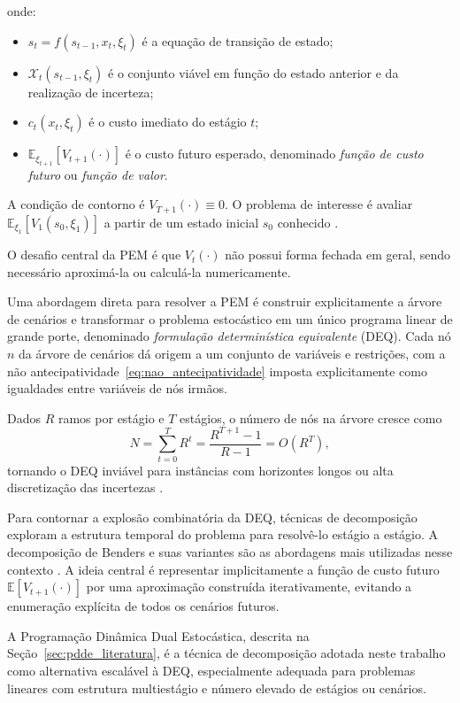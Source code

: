 onde:
\begin{itemize}
  \item $s_t = f(s_{t-1}, x_t, \xi_t)$ é a equação de transição de estado;
  \item $\mathcal{X}_t(s_{t-1}, \xi_t)$ é o conjunto viável em função do estado anterior e da realização de incerteza;
  \item $c_t(x_t, \xi_t)$ é o custo imediato do estágio $t$;
  \item $\mathbb{E}_{\xi_{t+1}}[V_{t+1}(\cdot)]$ é o custo futuro esperado, denominado \emph{função de custo futuro} ou \emph{função de valor}.
\end{itemize}

A condição de contorno é $V_{T+1}(\cdot) \equiv 0$. O problema de interesse é avaliar $\mathbb{E}_{\xi_1}[V_1(s_0, \xi_1)]$ a partir de um estado inicial $s_0$ conhecido \cite{shapiro2009,birge2011}.

O desafio central da PEM é que $V_t(\cdot)$ não possui forma fechada em geral, sendo necessário aproximá-la ou calculá-la numericamente.

Uma abordagem direta para resolver a PEM é construir explicitamente a árvore de cenários e transformar o problema estocástico em um único programa linear de grande porte, denominado \emph{formulação determinística equivalente} (DEQ). Cada nó $n$ da árvore de cenários dá origem a um conjunto de variáveis e restrições, com a não antecipatividade~\eqref{eq:nao_antecipatividade} imposta explicitamente como igualdades entre variáveis de nós irmãos.

Dados $R$ ramos por estágio e $T$ estágios, o número de nós na árvore cresce como
\begin{equation}
  N = \sum_{t=0}^{T} R^t = \frac{R^{T+1} - 1}{R - 1} = O(R^T),
  \label{eq:crescimento_deq}
\end{equation}
tornando o DEQ inviável para instâncias com horizontes longos ou alta discretização das incertezas \cite{birge2011}.

Para contornar a explosão combinatória da DEQ, técnicas de decomposição exploram a estrutura temporal do problema para resolvê-lo estágio a estágio. A decomposição de Benders e suas variantes são as abordagens mais utilizadas nesse contexto \cite{shapiro2009,birge2011}. A ideia central é representar implicitamente a função de custo futuro $\mathbb{E}[V_{t+1}(\cdot)]$ por uma aproximação construída iterativamente, evitando a enumeração explícita de todos os cenários futuros.

A Programação Dinâmica Dual Estocástica, descrita na Seção~\ref{sec:pdde_literatura}, é a técnica de decomposição adotada neste trabalho como alternativa escalável à DEQ, especialmente adequada para problemas lineares com estrutura multiestágio e número elevado de estágios ou cenários.


